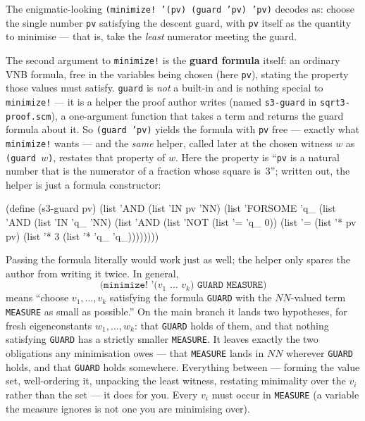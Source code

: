 \begin{remark}
\label{remark:minimize}
The enigmatic-looking \texttt{(minimize! '(pv) (guard 'pv) 'pv)} decodes as:
choose the single number \texttt{pv} satisfying the descent guard, with
\texttt{pv} itself as the quantity to minimise --- that is, take the
\emph{least} numerator meeting the guard.

The second argument to \texttt{minimize!} is the \textbf{guard formula} itself:
an ordinary VNB formula, free in the variables being chosen (here \texttt{pv}),
stating the property those values must satisfy.  \texttt{guard} is \emph{not} a
built-in and is nothing special to \texttt{minimize!} --- it is a helper the
proof author writes (named \texttt{s3-guard} in \texttt{sqrt3-proof.scm}), a
one-argument function that takes a term and returns the guard formula about it.
So \texttt{(guard 'pv)} yields the formula with \texttt{pv} free --- exactly what
\texttt{minimize!} wants --- and the \emph{same} helper, called later at the
chosen witness $w$ as \texttt{(guard $w$)}, restates that property of $w$.  Here
the property is ``\texttt{pv} is a natural number that is the numerator of a
fraction whose square is~$3$''; written out, the helper is just a formula
constructor:

\begin{VNBcode}
(define (s3-guard pv)
  (list 'AND (list 'IN pv 'NN)
        (list 'FORSOME 'q_
          (list 'AND (list 'IN 'q_ 'NN)
                (list 'AND (list 'NOT (list '= 'q_ 0))
                      (list '= (list '* pv pv) (list '* 3 (list '* 'q_ 'q_))))))))
\end{VNBcode}

Passing the formula literally would work just as well; the helper only spares the
author from writing it twice.  In general,
\[
  \texttt{(minimize! '($v_1$ \ldots\ $v_k$) GUARD MEASURE)}
\]
means ``choose $v_1,\ldots,v_k$ satisfying the formula \texttt{GUARD} with the
$\mathit{NN}$-valued term \texttt{MEASURE} as small as possible.''  On the main
branch it lands two hypotheses, for fresh eigenconstants $w_1,\ldots,w_k$: that
\texttt{GUARD} holds of them, and that nothing satisfying \texttt{GUARD} has a
strictly smaller \texttt{MEASURE}.  It leaves exactly the two obligations any
minimisation owes --- that \texttt{MEASURE} lands in $\mathit{NN}$ wherever
\texttt{GUARD} holds, and that \texttt{GUARD} holds somewhere.  Everything
between --- forming the value set, well-ordering it, unpacking the least
witness, restating minimality over the $v_i$ rather than the set --- it does for
you.  Every $v_i$ must occur in \texttt{MEASURE} (a variable the measure ignores
is not one you are minimising over).


\end{remark}
